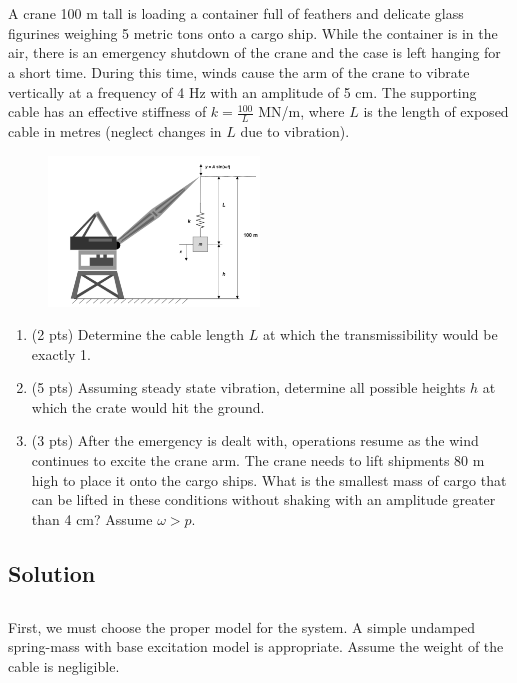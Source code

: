 \section{}
A crane 100 m tall is loading a container full of feathers and delicate glass figurines weighing 5 metric tons onto a cargo ship. While the container is in the air, there is an emergency shutdown of the crane and the case is left hanging for a short time. During this time, winds cause the arm of the crane to vibrate vertically at a frequency of 4 Hz with an amplitude of 5 cm. The supporting cable has an effective stiffness of $k = \frac{100}{L}$ MN/m, where $L$ is the length of exposed cable in metres (neglect changes in $L$ due to vibration).

\begin{figure}[h]
\centering
\includegraphics[width=0.5\textwidth]{Questions/Figures/q2 problem diagram.png}
\end{figure}
\FloatBarrier
\begin{enumerate}[label=(\alph*)]
    \item (2 pts) Determine the cable length $L$ at which the transmissibility would be exactly 1.
    \item (5 pts) Assuming steady state vibration, determine all possible heights $h$ at which the crate would hit the ground.
    \item (3 pts) After the emergency is dealt with, operations resume as the wind continues to excite the crane arm. The crane needs to lift shipments 80 m high to place it onto the cargo ships. What is the smallest mass of cargo that can be lifted in these conditions without shaking with an amplitude greater than 4 cm? Assume $\omega > p$.
\end{enumerate}
\FloatBarrier
\subsection*{Solution}
\subsection{}
First, we must choose the proper model for the system. A simple undamped spring-mass with base excitation model is appropriate. Assume the weight of the cable is negligible. 

